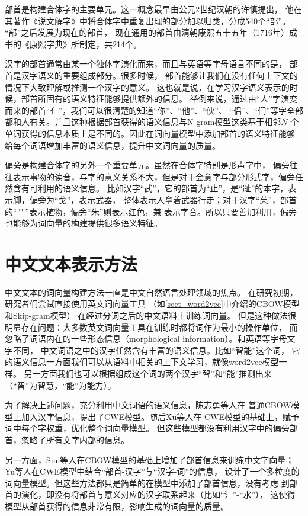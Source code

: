 \documentclass{standalone}
\begin{document}
部首是构建合体字的主要单元。这一概念最早由公元2世纪汉朝的许慎提出，
他在其著作《说文解字》中将合体字中重复出现的部分加以归类，分成540个“部”。
“部”之后发展为现在的部首，
现在通用的部首由清朝康熙五十五年（1716年）成书的《康熙字典》所制定，共214个。

汉字的部首通常由某一个独体字演化而来，而且与英语等字母语言不同的是，
部首是汉字语义的重要组成部分。很多时候，
部首能够让我们在没有任何上下文的情况下大致理解或推测一个汉字的意义。
这也就是说，在学习汉字语义表示的时候，部首所固有的语义特征能够提供额外的信息。
举例来说，通过由“人”字演变而来的部首“亻”，我们可以很清楚的知道“你”、“他”、“伙”、
“侣”、“们”等字全部都和人有关。并且这种根据部首获得的语义信息与N-gram模型这类基于相邻$N$
个单词获得的信息本质上是不同的。因此在词向量模型中添加部首的语义特征能够
给每个词语增加丰富的语义信息，提升中文词向量的质量。

偏旁是构建合体字的另外一个重要单元。虽然在合体字特别是形声字中，
偏旁往往表示事物的读音，与字的意义关系不大，但是对于会意字与部分形式字，偏旁任然含有可利用的语义信息。
比如汉字“武”，它的部首为“止”，是“趾”的本字，表示脚，偏旁为“戈”，表示武器，
整体表示人拿着武器行走；对于汉字“茱”，部首的“艹”表示植物，偏旁“朱”则表示红色，兼
表示字音。所以只要善加利用，偏旁也能够为词向量的构建提供很多语义特征。

\section{中文文本表示方法}
\label{word_vec_model}
中文文本的词向量构建方法一直是中文自然语言处理领域的焦点。
在研究初期，研究者们尝试直接使用英文词向量工具
（如\ref{sect_word2vec}中介绍的CBOW模型和Skip-gram模型）
在经过分词之后的中文语料上训练词向量。
但是这种做法很明显存在问题：大多数英文词向量工具在训练时都将词作为最小的操作单位，
而忽略了词语内在的一些形态信息（morphological information）。和英语等字母文字不同，
中文词语之中的汉字任然含有丰富的语义信息。比如“智能”这个词，
它的语义信息一方面我们可以从语料中相关的上下文学习，就像word2vec模型一样。
另一方面我们也可以根据组成这个词的两个汉字“智”和“能”推测出来（“智”为智慧，“能”为能力）。

为了解决上述问题，充分利用中文词语的语义信息，陈志勇等人在
普通CBOW模型上加入汉字信息，提出了CWE模型。随后Xu等人在
CWE模型的基础上，赋予词中每个字权重，优化整个词向量模型。
但这些模型都没有利用汉字中的偏旁部首，忽略了所有文字内部的信息。

另一方面，Sun等人在CBOW模型的基础上增加了部首信息来训练中文字向量；
Yu等人在CWE模型中结合“部首-汉字”与“汉字-词”的信息，
设计了一个多粒度的词向量模型。但这些方法都只是简单的在模型中添加了部首信息，没有考虑
到部首的演化，即没有将部首与意义对应的汉字联系起来（比如“氵”-“水”），
这使得模型从部首获得的信息非常有限，影响生成的词向量的质量。
\end{document}
